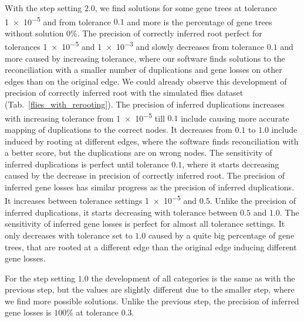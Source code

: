 With the step setting $2.0$, we find solutions for some gene trees at tolerance \num{1e-5} and from tolerance $0.1$ and more is the percentage of gene trees without solution $0\%$. The precision of correctly inferred root perfect for tolerances \num{1e-5} and \num{1e-3} and slowly decreases from tolerance $0.1$ and more caused by increasing tolerance, where our software finds solutions to the reconciliation with a smaller number of duplications and gene losses on other edges than on the original edge. We could already observe this development of precision of correctly inferred root with the simulated flies dataset (Tab.~\ref{flies_with_rerooting}). The precision of inferred duplications increases with increasing tolerance from \num{1e-5} till $0.1$ include causing more accurate mapping of duplications to the correct nodes. It decreases from $0.1$ to $1.0$ include induced by rooting at different edges, where the software finds reconciliation with a better score, but the duplications are on wrong nodes. The sensitivity of inferred duplications is perfect until tolerance $0.1$, where it starts decreasing caused by the decrease in precision of correctly inferred root. The precision of inferred gene losses has similar progress as the precision of inferred duplications. It increases between tolerance settings \num{1e-5} and $0.5$. Unlike the precision of inferred duplications, it starts decreasing with tolerance between $0.5$ and $1.0$. The sensitivity of inferred gene losses is perfect for almost all tolerance settings. It only decreases with tolerance set to $1.0$ caused by a quite big percentage of gene trees, that are rooted at a different edge than the original edge inducing different gene losses.

For the step setting $1.0$ the development of all categories is the same as with the previous step, but the values are slightly different due to the smaller step, where we find more possible solutions. Unlike the previous step, the precision of inferred gene losses is $100\%$ at tolerance $0.3$.

